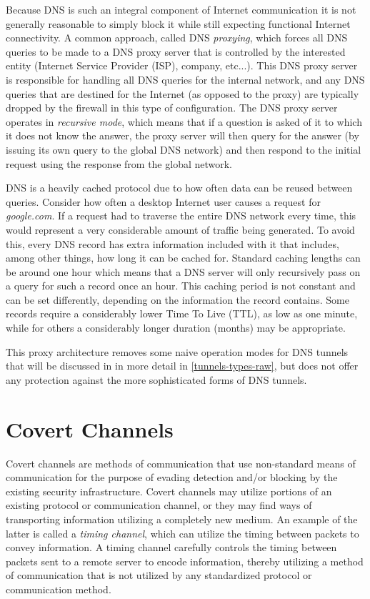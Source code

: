 \documentclass[12pt]{report}
\theoremstyle{remark}
\theoremstyle{definition}
\theoremstyle{definition}
\theoremstyle{definition}
\begin{document}
Because DNS is such an integral component of Internet communication it is not
generally reasonable to simply block it while still expecting functional
Internet connectivity. A common approach, called DNS \emph{proxying}, which
forces all DNS queries to be made to a DNS proxy server that is controlled by
the interested entity (Internet Service Provider (ISP), company, etc...). This DNS proxy server is
responsible for handling all DNS queries for the internal network, and any DNS
queries that are destined for the Internet (as opposed to the proxy) are
typically dropped by the firewall in this type of configuration. The DNS proxy
server operates in \emph{recursive mode}, which means that if a question is
asked of it to which it does not know the answer, the proxy server will then
query for the answer (by issuing its own query to the global DNS network) and
then respond to the initial request using the response from the global network.

DNS is a heavily cached protocol due to how often data can be reused between
queries. Consider how often a desktop Internet user causes a request for
\emph{google.com}. If a request had to traverse the entire DNS network every
time, this would represent a very considerable amount of traffic being
generated. To avoid this, every DNS record has extra information included with it that
includes, among other things, how long it can be cached for. Standard caching
lengths can be around one hour which means that a DNS server will only
recursively pass on a query for such a record once an hour. This caching period is
not constant and can be set differently, depending on the information the record
contains. Some records require a considerably lower Time To Live (TTL), as low
as one minute, while for others a considerably longer duration (months) may be
appropriate.

This proxy architecture removes some naive operation modes for DNS tunnels that
will be discussed in in more detail in \ref{tunnels-types-raw}, but does not
offer any protection against the more sophisticated forms of DNS tunnels.

\section{Covert Channels}

Covert channels are methods of communication that use non-standard means of
communication for the purpose of evading detection and/or blocking by the
existing security infrastructure. Covert channels may utilize portions of an
existing protocol\cite{Born2010.psudp} or communication channel, or they may
find ways of transporting information utilizing a completely new medium. An
example of the latter is called a \emph{timing channel}\cite{Sellke2009}, which
can utilize the timing between packets to convey information. A timing channel
carefully controls the timing between packets sent to a remote server to encode
information, thereby utilizing a method of communication that is not utilized by
any standardized protocol or communication method.
\end{document}
